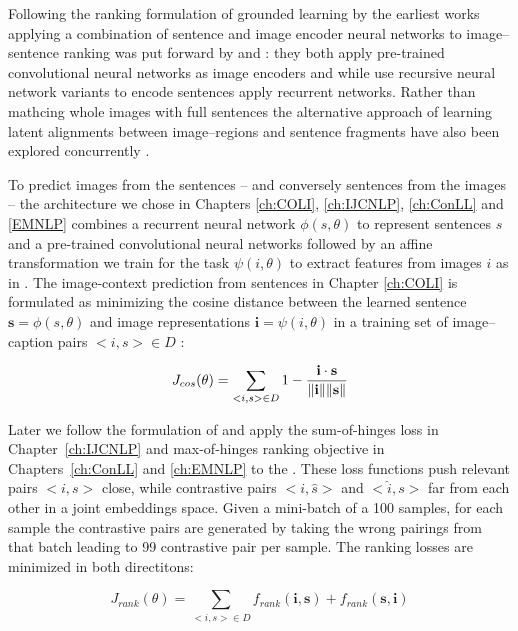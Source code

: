 Following the ranking formulation of grounded learning by \citep{hodosh2013framing}
the earliest works applying a combination of sentence and image encoder neural networks
to image--sentence ranking was put forward by \cite{kiros2014unifying} and \cite{socher2014grounded}:
they both apply pre-trained convolutional neural networks as image encoders and while 
\cite{socher2014grounded} use recursive neural network variants to encode sentences 
\cite{kiros2014unifying} apply recurrent networks. Rather than mathcing whole images with full
sentences the alternative approach of learning latent alignments between image--regions and
sentence fragments have also been explored concurrently \citep{karpathy2014deep,karpathy2015deep}.


To predict images from the sentences -- and conversely sentences from the images --
the architecture we chose in
Chapters \ref{ch:COLI}, \ref{ch:IJCNLP}, \ref{ch:ConLL} and \ref{EMNLP}  combines 
a recurrent neural network $\phi(s, \theta)$ to
represent sentences $s$ and a pre-trained convolutional neural networks 
followed by an affine transformation we train for the task  $\psi(i, \theta)$ 
to extract features from images $i$  as in \citep{kiros2014unifying}. 
The image-context prediction from sentences in 
Chapter \ref{ch:COLI} is formulated  as minimizing the cosine distance
between the learned sentence $\mathbf{s} = \phi(s, \theta)$ and image representations 
$\mathbf{i} = \psi(i, \theta)$ in a training set of image--caption pairs $<i,s> \in D$ :

\begin{equation}
J_{cos}(\theta) = \sum_{<i,s> \in D} 1 - \frac{\mathbf{i} \cdot \mathbf{s}}{\| \mathbf{i}\| \| \mathbf{s} \|} \\
\end{equation}

Later we follow the formulation of \citep{vendrov2015order,faghri2017vse++} and apply 
the sum-of-hinges loss in Chapter~\ref{ch:IJCNLP} and max-of-hinges ranking objective
in Chapters~\ref{ch:ConLL} and \ref{ch:EMNLP} to the . These loss functions 
push relevant pairs $<i, s>$ close, while contrastive pairs  $<i, \hat{s}>$ and $<\hat{i}, s>$
far from each other in a joint embeddings space. Given a mini-batch of a 100 samples, for each sample
the contrastive pairs are generated by taking the wrong pairings from that batch leading to 
99 contrastive pair per sample. The ranking losses are minimized in both directitons:

\begin{equation}
J_{rank}(\theta) = \sum_{<i,s> \in D} f_{rank}(\mathbf{i}, \mathbf{s}) + f_{rank}(\mathbf{s}, \mathbf{i}) 
\end{equation}

